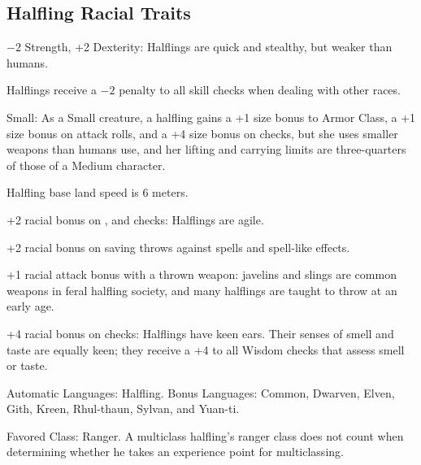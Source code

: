 \subsection{Halfling Racial Traits}
\begin{itemize*}
    \item $-2$ Strength, +2 Dexterity: Halflings are quick and stealthy, but weaker than humans.
    \item Halflings receive a $-2$ penalty to all  skill checks when dealing with other races.
    \item Small: As a Small creature, a halfling gains a +1 size bonus to Armor Class, a +1 size bonus on attack rolls, and a +4 size bonus on  checks, but she uses smaller weapons than humans use, and her lifting and carrying limits are three-quarters of those of a Medium character.%
    \item Halfling base land speed is 6 meters.
    \item +2 racial bonus on ,  and  checks: Halflings are agile.
    \item +2 racial bonus on saving throws against spells and spell-like effects.
    \item +1 racial attack bonus with a thrown weapon: javelins and slings are common weapons in feral halfling society, and many halflings are taught to throw at an early age.
    \item +4 racial bonus on  checks: Halflings have keen ears. Their senses of smell and taste are equally keen; they receive a +4 to all Wisdom checks that assess smell or taste.
    \item Automatic Languages: Halfling. Bonus Languages: Common, Dwarven, Elven, Gith, Kreen, Rhul-thaun, Sylvan, and Yuan-ti.
    \item Favored Class: Ranger. A multiclass halfling's ranger class does not count when determining whether he takes an experience point for multiclassing.
\end{itemize*}